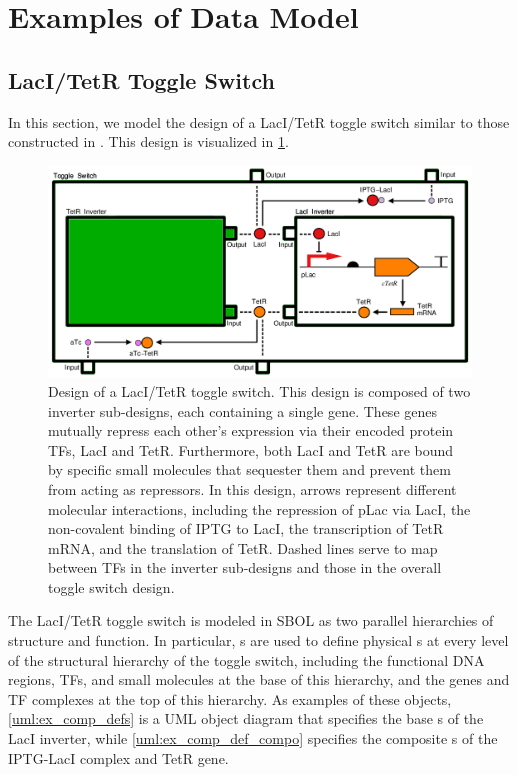 \section{Examples of Data Model}
\label{sec:examples}

\subsection{LacI/TetR Toggle Switch}

In this section, we model the design of a LacI/TetR toggle switch similar to those constructed in \cite{Gardner2000}. This design is visualized in \ref{images:toggleswitch_modular}. 

\begin{figure}[ht]
\begin{center}
\includegraphics[scale=0.4]{images/toggleswitch_modular}
\caption[]{Design of a LacI/TetR toggle switch. This design is composed of two inverter sub-designs, each containing a single gene. These genes mutually repress each other's expression via their encoded protein TFs, LacI and TetR. Furthermore, both LacI and TetR are bound by specific small molecules that sequester them and prevent them from acting as repressors. In this design, arrows represent different molecular interactions, including the repression of pLac via LacI, the non-covalent binding of IPTG to LacI, the transcription of TetR mRNA, and the translation of TetR. Dashed lines serve to map between TFs in the inverter sub-designs and those in the overall toggle switch design.}
\label{images:toggleswitch_modular}
\end{center}
\end{figure}

The LacI/TetR toggle switch is modeled in SBOL as two parallel hierarchies of structure and function. In particular, s are used to define physical s at every level of the structural hierarchy of the toggle switch, including the functional DNA regions, TFs, and small molecules at the base of this hierarchy, and the genes and TF complexes at the top of this hierarchy. As examples of these objects,  \ref{uml:ex_comp_defs} is a UML object diagram that specifies the base s of the LacI inverter, while \ref{uml:ex_comp_def_compo} specifies the composite s of the IPTG-LacI complex and TetR gene. 

